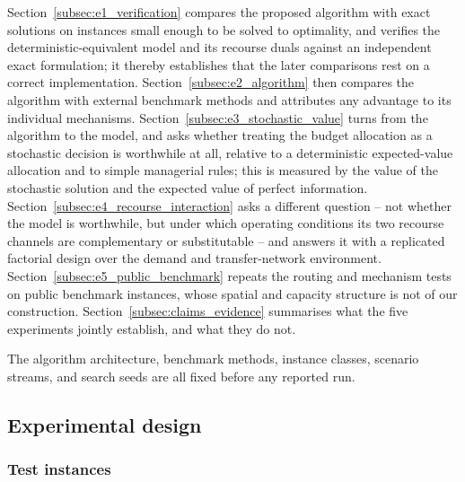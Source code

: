 \documentclass[authoryear,final,3p,times]{elsarticle}
\theoremstyle{definition}
\theoremstyle{plain}
\begin{document}
Section~\ref{subsec:e1_verification} compares the proposed algorithm with
exact solutions on instances small enough to be solved to optimality, and
verifies the deterministic-equivalent model and its recourse duals against an
independent exact formulation; it thereby establishes that the later
comparisons rest on a correct implementation.  Section~\ref{subsec:e2_algorithm} then compares the
algorithm with external benchmark methods and attributes any advantage to its
individual mechanisms.  Section~\ref{subsec:e3_stochastic_value} turns from
the algorithm to the model, and asks whether treating the budget allocation
as a stochastic decision is worthwhile at all, relative to a deterministic
expected-value allocation and to simple managerial rules; this is measured by
the value of the stochastic solution and the expected value of perfect
information.  Section~\ref{subsec:e4_recourse_interaction} asks a different
question -- not whether the model is worthwhile, but under which operating
conditions its two recourse channels are complementary or substitutable --
and answers it with a replicated factorial design over the demand and
transfer-network environment.  Section~\ref{subsec:e5_public_benchmark}
repeats the routing and mechanism tests on public benchmark instances, whose
spatial and capacity structure is not of our construction.
Section~\ref{subsec:claims_evidence} summarises what the five experiments
jointly establish, and what they do not.

The algorithm architecture, benchmark methods, instance classes, scenario
streams, and search seeds are all fixed before any reported run.

\subsection{Experimental design}
\label{subsec:experimental_setup}

\subsubsection{Test instances}
\label{subsubsec:test_instances}
\end{document}
